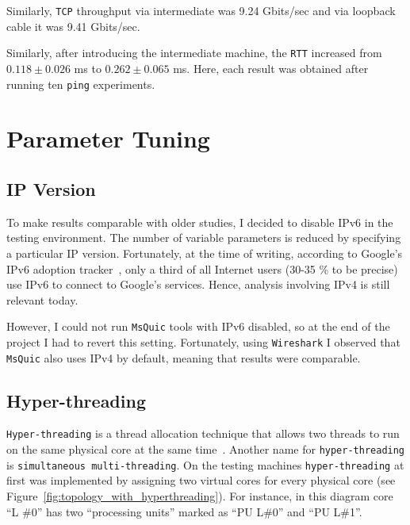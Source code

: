 \documentclass[12pt,a4paper,twoside,openright]{report}
\begin{document}
    Similarly, \texttt{TCP} throughput via intermediate was 9.24 Gbits/sec and via loopback cable it was 9.41 Gbits/sec.


    Similarly, after introducing the intermediate machine, the \texttt{RTT} increased from
    $0.118 \pm 0.026$ ms to $0.262 \pm 0.065$ ms.
    Here, each result was obtained after running ten \texttt{ping} experiments.
    




\section{Parameter Tuning}

\subsection{IP Version}

To make results comparable with older studies, I decided to disable IPv6 in the testing environment.
The number of variable parameters is reduced by specifying a particular IP version.
Fortunately, at the time of writing, according to Google's IPv6 adoption tracker~\cite{IPv6_Adoption_Statistics}, only a third of all Internet users (30-35 \% to be precise) use IPv6 to connect to Google's services.
Hence, analysis involving IPv4 is still relevant today.

However, I could not run \texttt{MsQuic} tools with IPv6 disabled, so at the end of the project I had to revert this setting.
Fortunately, using \texttt{Wireshark} I observed that \texttt{MsQuic} also uses IPv4 by default, meaning that results were comparable.

\subsection{Hyper-threading}\label{Hyperthreading_Subsection_Tag}

\texttt{Hyper-threading} is a thread allocation technique that allows two threads to run on the same physical core at the same time~\cite[page~ 23]{hyperthreading_book}.
Another name for \texttt{hyper-threading} is \texttt{simultaneous multi-threading}.
On the testing machines \texttt{hyper-threading} at first was implemented by assigning two virtual cores for every physical core (see Figure~\ref{fig:topology_with_hyperthreading}).
For instance, in this diagram core \enquote{L \#0} has two \enquote{processing units} marked as \enquote{PU L\#0} and \enquote{PU L\#1}.
\end{document}
